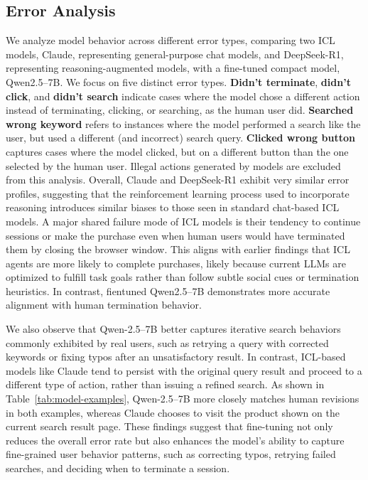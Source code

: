 \documentclass{article} %
\begin{document}
\subsection{Error Analysis}
\label{sec:error-anaysis}
We analyze model behavior across different error types, comparing two ICL models, Claude, representing general-purpose chat models, and DeepSeek-R1, representing reasoning-augmented models, with a fine-tuned compact model, Qwen2.5–7B.
We focus on five distinct error types. \textbf{Didn't terminate}, \textbf{didn't click}, and \textbf{didn't search} indicate cases where the model chose a different action instead of terminating, clicking, or searching, as the human user did. \textbf{Searched wrong keyword} refers to instances where the model performed a search like the user, but used a different (and incorrect) search query. \textbf{Clicked wrong button} captures cases where the model clicked, but on a different button than the one selected by the human user.
Illegal actions generated by models are excluded from this analysis.
Overall, Claude and DeepSeek-R1 exhibit very similar error profiles, suggesting that the reinforcement learning process used to incorporate reasoning introduces similar biases to those seen in standard chat-based ICL models. A major shared failure mode of ICL models is their tendency to continue sessions or make the purchase even when human users would have terminated them by closing the browser window. This aligns with earlier findings that ICL agents are more likely to complete purchases, likely because current LLMs are optimized to fulfill task goals rather than follow subtle social cues or termination heuristics. In contrast, fientuned Qwen2.5–7B demonstrates more accurate alignment with human termination behavior.

We also observe that Qwen-2.5–7B better captures iterative search behaviors commonly exhibited by real users, such as retrying a query with corrected keywords or fixing typos after an unsatisfactory result. In contrast, ICL-based models like Claude tend to persist with the original query result and proceed to a different type of action, rather than issuing a refined search.
As shown in Table~\ref{tab:model-examples}, Qwen-2.5–7B more closely matches human revisions in both examples, whereas Claude chooses to visit the product shown on the current search result page.
These findings suggest that fine-tuning not only reduces the overall error rate but also enhances the model's ability to capture fine-grained user behavior patterns, such as correcting typos, retrying failed searches, and deciding when to terminate a session.
\end{document}

